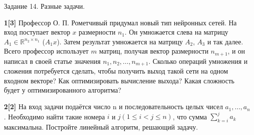 \documentclass{article}
\begin{document}
\begin{center}
\Large {Задание 14. Разные задачи.}
\end{center}

\bigskip

\textbf{1[3]} Профессор О. П. Рометчивый придумал новый тип нейронных сетей. На вход поступает вектор $x$ размерности $n_1$. Он умножается слева на матрицу $A_1 \in \mathbb{R}^{n_2 \times n_1}$ ($A_1 x$). Затем результат умножается на матрицу $A_2$, $A_3$ и так далее. Всего профессор использует $m$ матриц, получая вектор размерности $n_{m+1}$, и он написал в своей статье значения $n_1, n_2, \dots, n_{m+1}$. Сколько операций умножения и сложения потребуется сделать, чтобы получить выход такой сети на одном входном векторе? Как оптимизировать вычисление выхода? Какая сложность будет у оптимизированного алгоритма?

\medskip

\textbf{2[2]} На вход задачи подаётся число n и последовательность целых чисел $a_1, \dots, a_n$. Необходимо
найти такие номера $i$ и $j (1 \leq i < j \leq n)$, что сумма $\sum_{k=i}^{j} a_k$ максимальна.
Постройте линейный алгоритм, решающий задачу.
\end{document}
